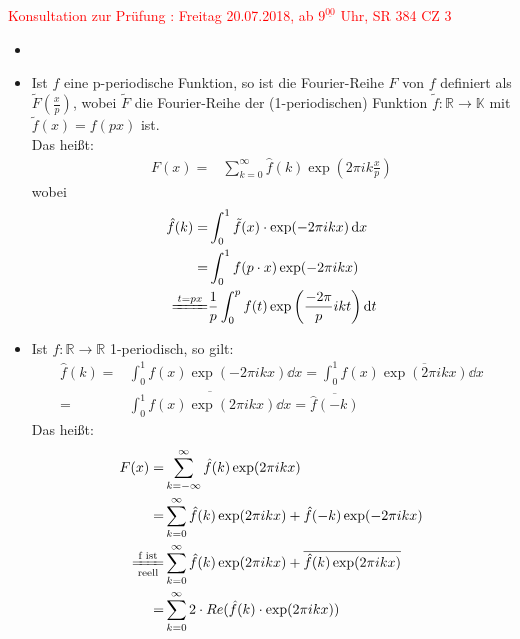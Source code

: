 
\textcolor{red}{Konsultation zur Prüfung : Freitag 20.07.2018, 
ab $9^{\underline{00}}$ Uhr, SR 384 CZ 3}

\begin{Bemerkung}{
	\begin{itemize}
		\item[ ]
		\item Ist $f$ eine p-periodische Funktion, so ist die Fourier-Reihe $F$ 
		von $f$ definiert als $\tilde{F}(\frac{x}{p})$, wobei $\tilde{F}$ die 
		Fourier-Reihe der (1-periodischen) Funktion $\tilde{f}: \mathbb{R} 
		\rightarrow \mathbb{K}$ mit $\tilde{f}(x) = f(px)$ ist. \\
		Das heißt:
		\begin{align*}
			F(x) = & \sum_{k=0}^{\infty} \hat{f}(k) \exp\left( 2\pi i k 
				\frac{x}{p}\right)
		\end{align*}
		wobei
		\begin{align*}
			\hat{f} (k) = & \int_0^1 \tilde{f}(x) \cdot 
				\exp(-2\pi i k x) \dd{x} \\
			 = & \int_0^1 f(p\cdot x)\exp(-2\pi i k x) \\
			\xlongequal{t = px} & \frac{1}{p}\int_0^p f(t) 
			\exp\left( \frac{-2\pi}{p}ikt \right) \dd{t}
		\end{align*}
		\item Ist $f: \mathbb{R} \rightarrow \mathbb{R}$ 1-periodisch, so 
		gilt:
		\begin{align*}
			\hat{f}(k) = & \int_0^1 f(x) \exp( -2\pi i k x) \dd{x}	
			= \int_0^1 f(x) \overline{\exp(2\pi i k x)} \dd{x} \\
			= & \overline{\int_0^1 f(x) \exp(2\pi i k x) \dd{x}} = 
			\overline{\hat{f}(-k)}			
		\end{align*}		
		Das heißt:
		\begin{align}
			F(x) = & \sum_{k= - \infty}^{\infty} \hat{f}(k) \exp(2\pi i k x) 
				\notag \\ 
			= &\sum_{k=0}^{\infty} \hat{f}(k) \exp(2\pi ikx) + \hat{f}(-k) 
			\exp(-2\pi i kx) \notag \\
			\xlongequal[\text{reell}]{\text{f ist}} &
			\sum_{k=0}^{\infty} \hat{f}(k)\exp(2\pi ikx) 
				+ \overline{\hat{f}(k) \exp(2\pi ikx)} \notag \\ 
			= & \sum_{k=0}^{\infty} 2 \cdot Re(\hat{f}(k) \cdot 
			\exp(2\pi i kx)) \label{vl_19_gl_1}
		\end{align}

\end{itemize}}
\end{Bemerkung}
